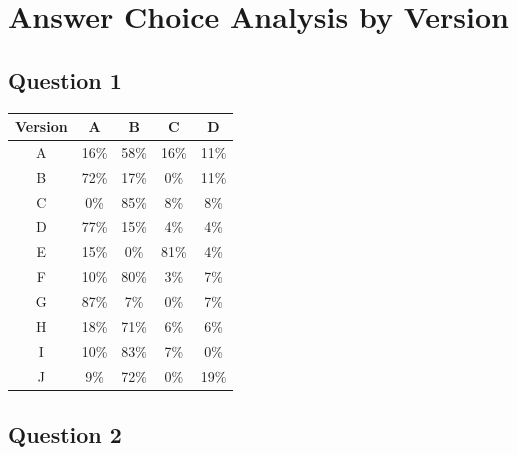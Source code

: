 \documentclass[12pt, a4paper]{article}
\begin{document}
	\newpage
	\section{Answer Choice Analysis by Version}
	
	\subsection{Question 1}
	
	\begin{table}[H]
		\centering
		\renewcommand{\arraystretch}{1.3}
		\begin{tabular}{ccccc}
			\toprule
			\rowcolor{primary}
			\color{white}\textbf{Version} &
			\color{white}\textbf{A} &
			\color{white}\textbf{B} &
			\color{white}\textbf{C} &
			\color{white}\textbf{D} \\
			\midrule
			\rowcolor{rowA} A & 16\% & 58\% & 16\% & 11\% \\
			\rowcolor{rowB} B & 72\% & 17\% &  0\% & 11\% \\
			\rowcolor{rowA} C &  0\% & 85\% &  8\% &  8\% \\
			\rowcolor{rowB} D & 77\% & 15\% &  4\% &  4\% \\
			\rowcolor{rowA} E & 15\% &  0\% & 81\% &  4\% \\
			\rowcolor{rowB} F & 10\% & 80\% &  3\% &  7\% \\
			\rowcolor{rowA} G & 87\% &  7\% &  0\% &  7\% \\
			\rowcolor{rowB} H & 18\% & 71\% &  6\% &  6\% \\
			\rowcolor{rowA} I & 10\% & 83\% &  7\% &  0\% \\
			\rowcolor{rowB} J &  9\% & 72\% &  0\% & 19\% \\
			\bottomrule
		\end{tabular}
	\end{table}
	
	\subsection{Question 2}
	
\end{document}
